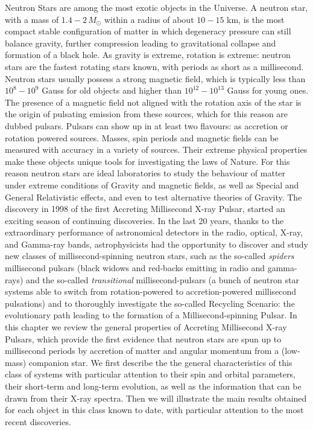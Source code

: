 \documentclass[graybox]{svmult}
\begin{document}
\abstract{}
Neutron Stars are among the most exotic objects in the Universe. A neutron star, with a mass of $1.4-2\, M_\odot$ within a radius of about $10-15$ km, is the most compact stable configuration of matter in which degeneracy pressure can still balance gravity, further compression leading to gravitational collapse and formation of a black hole. As gravity is extreme, rotation is extreme: neutron stars are the fastest rotating stars known, with periods as short as a millisecond. Neutron stars usually possess a strong magnetic field, which is typically less than $10^8-10^9$ Gauss for old objects and higher than $10^{12}-10^{13}$ Gauss for young ones. The presence of a magnetic field not aligned with the rotation axis of the star is the origin of pulsating emission from these sources, which for this reason are dubbed pulsars. Pulsars can show up in at least two flavours: as accretion or rotation powered sources. Masses, spin periods and magnetic fields can be measured with accuracy in a variety of sources. Their extreme physical properties make these objects unique tools for investigating the laws of Nature. For this reason neutron stars are ideal laboratories to study the behaviour of matter under extreme conditions of Gravity and magnetic fields, as well as Special and General Relativistic effects, and even to test alternative theories of Gravity.
The discovery in 1998 of the first Accreting Millisecond X-ray Pulsar, started an exciting season of continuing discoveries. In the last 20 years, thanks to the extraordinary performance of astronomical detectors in the radio, optical, X-ray, and Gamma-ray bands, astrophysicists had the opportunity to discover and study new classes of millisecond-spinning neutron stars, such as the so-called {\it spiders} millisecond pulsars (black widows and red-backs emitting in radio and gamma-rays) and the so-called {\it transitional} millisecond-pulsars (a bunch of neutron star systems able to switch from rotation-powered to accretion-powered millisecond pulsations) and to thoroughly investigate the so-called Recycling Scenario: the evolutionary path leading to the formation of a Millisecond-spinning Pulsar. 
In this chapter we review the general properties of Accreting Millisecond X-ray Pulsars, which provide the first evidence that neutron stars are spun up to millisecond periods by accretion of matter and angular momentum from a (low-mass) companion star. We first describe the
the general characteristics of this class of systems with particular attention to their spin and orbital parameters, their short-term and long-term evolution, as well as the information that can be drawn from their X-ray spectra. Then we will illustrate the main results obtained for each object in this class known to date, with particular attention to the most recent discoveries.  
\end{document}
